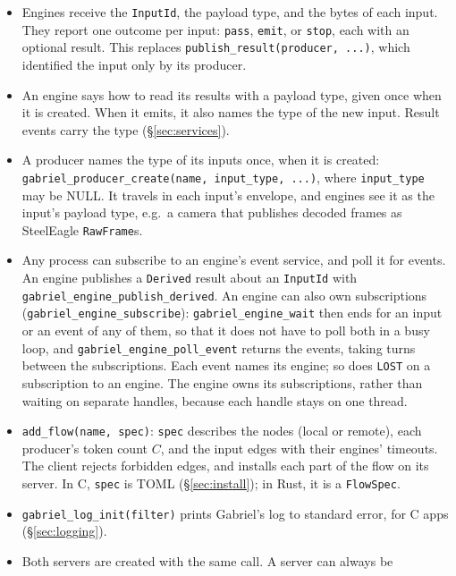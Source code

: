\documentclass[11pt]{article}
\newcommand{\code}[1]{\texttt{#1}}
\begin{document}
\begin{itemize}[nosep]
  \item Engines receive the \code{InputId}, the payload type, and the bytes of
        each input. They report one outcome per input: \code{pass}, \code{emit}, or \code{stop}, each with
        an optional result. This replaces \code{publish\_result(producer,
        ...)}, which identified the input only by its producer.
  \item An engine says how to read its results with a payload type, given
        once when it is created. When it emits, it also names the type of the
        new input. Result events carry the type
        (\S\ref{sec:services}).
  \item A producer names the type of its inputs once, when it is created:
        \code{gabriel\_producer\_create(name, input\_type, ...)}, where
        \code{input\_type} may be NULL. It travels in each input's envelope,
        and engines see it as the input's payload type, e.g.\ a camera that
        publishes decoded frames as SteelEagle \code{RawFrame}s.
  \item Any process can subscribe to an engine's event service, and poll it
        for events. An engine publishes a \code{Derived} result about an
        \code{InputId} with \code{gabriel\_engine\_publish\_derived}. An engine can also own subscriptions
        (\code{gabriel\_engine\_subscribe}): \code{gabriel\_engine\_wait}
        then ends for an input or an event of any of them, so that it does not
        have to poll both in a busy loop, and
        \code{gabriel\_engine\_poll\_event} returns the events, taking turns
        between the subscriptions. Each event names its engine; so does
        \code{LOST} on a subscription to an engine. The engine owns its
        subscriptions, rather than waiting on separate handles, because each
        handle stays on one thread.
  \item \code{add\_flow(name, spec)}: \code{spec} describes the nodes (local
        or remote), each producer's token count $C$, and the input edges with
        their engines' timeouts. The client rejects forbidden edges, and
        installs each part of the flow on its server. In C, \code{spec} is
        TOML (\S\ref{sec:install}); in Rust, it is a \code{FlowSpec}.
  \item \code{gabriel\_log\_init(filter)} prints Gabriel's log to standard
        error, for C apps (\S\ref{sec:logging}).
  \item Both servers are created with the same call. A server can always be

\end{itemize}
\end{document}
